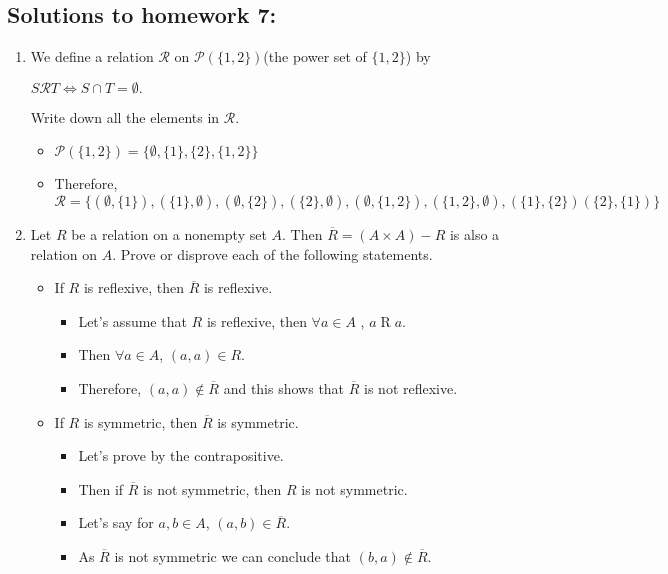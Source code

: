 \documentclass[letterpaper,12pt]{article}
\begin{document}
\subsection*{Solutions to homework 7:}

\begin{enumerate}
\item We define a relation $\mathcal{R}$ on $\mathcal{P}(\{1,2\})$(the power set of $\{1,2\}$) by 
\begin{center} 
$S\mathcal{R}T \Longleftrightarrow S \cap T = \emptyset.$	
\end{center}
Write down all the elements in $\mathcal{R}$.
\begin{itemize}
	\item $\mathcal{P}(\{1,2\}) = \{\emptyset,\{1\},\{2\},\{1,2\}\}$
	\item Therefore, $\mathcal{R} = \{(\emptyset,\{1\}),(\{1\},\emptyset),(\emptyset,\{2\}),(\{2\},\emptyset),(\emptyset,\{1,2\}),(\{1,2\}, \emptyset),(\{1\},\{2\}) (\{2\},\{1\})\}$
\end{itemize} 
\item Let $R$ be a relation on a nonempty set $A$. Then $\overline R = (A \times A)-R$ is also a relation on $A$. Prove or disprove each of the following statements.
\begin{itemize}
\item If $R$ is reflexive, then $\overline R$ is reflexive.
\begin{itemize}
\item Let's assume that $R$ is reflexive, then $\forall a \in A$ , $a \mathrel R a$.
\item Then $\forall a \in A$, $(a,a) \in R$.
\item Therefore, $(a,a) \notin \overline R$ and this shows that $\overline R$ is not reflexive.
\end{itemize}	
\item If $R$ is symmetric, then $\overline R $ is symmetric.
\begin{itemize}
\item Let's prove by the contrapositive.
\item Then if $\overline R $ is not symmetric, then $R$ is not symmetric.
\item Let's say for $a,b \in A$, $(a,b) \in \overline R$.
\item As $\overline R $ is not symmetric we can conclude that $(b,a) \notin \overline R$.

\end{itemize}
\end{itemize}
\end{enumerate}
\end{document}
